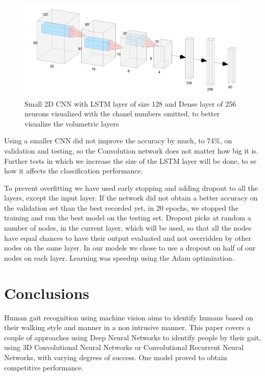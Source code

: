 \documentclass[12pt]{article}
\theoremstyle{definition}
\begin{document}
	\begin{figure}
		\includegraphics[width=\textwidth]{small-2D-CNN-LSTM-Dense.png}
		\caption{Small 2D CNN with LSTM layer of size 128 and Dense layer of 256 neurons visualized with the chanel numbers omitted, to better visualize the volumetric layers}
		\label{figure:small-2D-CNN-LSTM-Dense}
	\end{figure}

	Using a smaller CNN did not improve the accuracy by much, to 74\%, on validation and testing, so the Convolution network does not matter how big it is. Further tests in which we increase the size of the LSTM layer will be done, to se how it affects the classification performance.

	To prevent overfitting we have used early stopping and adding dropout to all the layers, except the input layer. If the network did not obtain a better accuracy on the validation set than the best recorded yet, in 20 epochs, we stopped the training and run the best model on the testing set. Dropout picks at random a number of nodes, in the current layer, which will be used, so that all the nodes have equal chances to have their output evaluated and not overridden by other nodes on the same layer. In our models we chose to use a dropout on half of our nodes on each layer. Learning was speedup using the Adam optimization.

	\clearpage

	\section{Conclusions}
	\vspace{1cm}

	Human gait recognition using machine vision aims to identify humans based on their walking style and manner in a non intrusive manner. This paper covers a couple of approaches using Deep Neural Networks to identify people by their gait, using 3D Convolutional Neural Networks or Convolutional Recurrent Neural Networks, with varying degrees of success. One model proved to obtain competitive performance.
\end{document}
